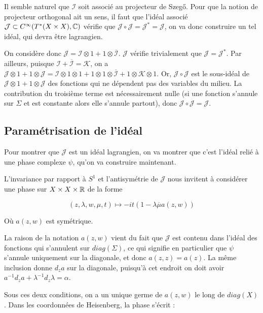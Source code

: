Il semble naturel que $\mathcal{I}$ soit associé au projecteur de Szeg\H{o}. Pour que la notion de projecteur orthogonal ait un sens, il faut que l'idéal associé $\mathcal{J} \subset C^{\infty}(T^*(X\times X), \mathbb{C})$ vérifie que $\mathcal{J} \circ \mathcal{J} = \mathcal{J}^*=\mathcal{J}$, on va donc construire un tel idéal, qui devra être lagrangien.

On considère donc $\mathcal{J} = \mathcal{I} \otimes 1 + 1 \otimes \overline{\mathcal{I}}$. $\mathcal{J}$ vérifie trivialement que $\mathcal{J}=\mathcal{J}^*$. Par ailleurs, puisque $\mathcal{I} + \overline{\mathcal{I}}=\mathcal{K}$, on a $\mathcal{J} \otimes 1 + 1 \otimes \mathcal{J} = \mathcal{I} \otimes 1 \otimes 1 + 1 \otimes 1 \otimes \overline{\mathcal{I}} + 1 \otimes \mathcal{K} \otimes 1$. Or, $\mathcal{J} \circ \mathcal{J}$ est le sous-idéal de $\mathcal{J} \otimes 1 + 1 \otimes \mathcal{J}$ des fonctions qui ne dépendent pas des variables du milieu. La contribution du troisième terme est nécessairement nulle (si une fonction s'annule sur $\Sigma$ et est constante alors elle s'annule partout), donc $\mathcal{J} \circ \mathcal{J} = \mathcal{J}$.

\subsection{Paramétrisation de l'idéal}
Pour montrer que $\mathcal{J}$ est un idéal lagrangien, on va montrer que c'est l'idéal relié à une phase complexe $\psi$, qu'on va construire maintenant.

L'invariance par rapport à $S^1$ et l'antisymétrie de $\mathcal{J}$ nous invitent à considérer une phase sur $X \times X \times \mathbb{R}$ de la forme

\begin{equation*}
	(z, \lambda ,w, \mu ,t) \mapsto -it(1-\lambda \overline{\mu}a(z,w))
\end{equation*}

Où $a(z,w)$ est symétrique.

La raison de la notation $a(z,w)$ vient du fait que $\mathcal{J}$ est contenu dans l'idéal des fonctions qui s'annulent sur $diag(\Sigma)$, ce qui signifie en particulier que $\psi$ s'annule uniquement sur la diagonale, et donc $a(z,z)=a(z)$. La même inclusion donne $d_za$ sur la diagonale, puisqu'à cet endroit on doit avoir $a^{-1}d_za + \lambda^{-1}d_z \lambda = \alpha$.

Sous ces deux conditions, on a un unique germe de $a(z,w)$ le long de $diag(X)$. Dans les coordonnées de Heisenberg, la phase s'écrit :

